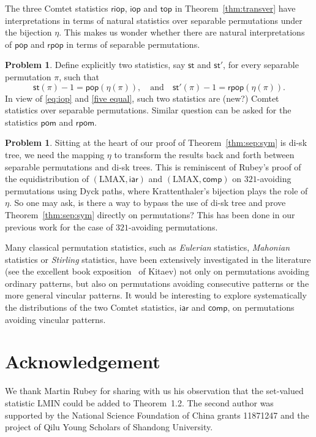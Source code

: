 \documentclass[12pt]{amsart}
\numberwithin{equation}{section}
\theoremstyle{plain}
\theoremstyle{definition}
\newtheorem{?}[theorem]{Problem}
\def\iar{\mathsf{iar}}
\def\comp{\mathsf{comp}}
\def\LMAX{\mathrm{LMAX}}
\def\LMIN{\mathrm{LMIN}}
\def\LMIN{\mathrm{LMIN}}
\def\st{\mathsf{st}}
\def\iop{\mathsf{iop}}
\def\top{\mathsf{top}}
\def\riop{\mathsf{riop}}
\def\pop{\mathsf{pop}}
\def\rpop{\mathsf{rpop}}
\def\pom{\mathsf{pom}}
\def\rpom{\mathsf{rpom}}
\begin{document}
The three Comtet statistics $\riop$, $\iop$ and $\top$ in Theorem~\ref{thm:transver} have  interpretations in terms of natural statistics over separable permutations under the bijection $\eta$. This makes us wonder whether there are natural interpretations of $\pop$ and $\rpop$ in terms of separable permutations. 
\begin{?}
Define explicitly two statistics, say $\st$ and $\st'$, for every separable permutation $\pi$, such that
$$\st(\pi)-1 = \pop(\eta(\pi)),\quad \text{and} \quad \st'(\pi)-1 = \rpop(\eta(\pi)).$$
In view of \eqref{eq:iop} and \eqref{five equal}, such two statistics are (new?) Comtet statistics over separable permutations. Similar question can be asked for the statistics $\pom$ and $\rpom$.
\end{?}
\begin{?}
Sitting at the heart of our proof of Theorem~\ref{thm:sep:sym} is di-sk tree, we need the mapping $\eta$ to transform the results back and forth between separable permutations and di-sk trees. This is reminiscent of Rubey's proof \cite{rub} of the equidistribution of $(\LMAX,\iar)$ and $(\LMAX,\comp)$ on $321$-avoiding permutations using Dyck paths, where Krattenthaler's bijection plays the role of $\eta$. So one may ask, is there a way to bypass the use of di-sk tree and prove Theorem~\ref{thm:sep:sym} directly on permutations? This has been done in our previous work \cite{flw} for the case of $321$-avoiding permutations.
\end{?}


Many classical permutation statistics, such as {\em Eulerian} statistics, {\em Mahonian} statistics or {\em Stirling} statistics, have been extensively investigated in the literature (see the excellent book exposition~\cite{kit} of Kitaev) not only on permutations avoiding ordinary  patterns, but also on permutations avoiding consecutive patterns or the more general vincular patterns. It would be interesting to explore systematically the distributions of the two Comtet statistics, $\iar$ and $\comp$, on permutations avoiding vincular patterns.




\section*{Acknowledgement}

We thank Martin Rubey for sharing with us his observation that  the set-valued statistic $\LMIN$ could be added to Theorem~1.2.
The second author was supported
by the National Science Foundation of China grants 11871247 and the project of Qilu Young Scholars of Shandong University.
\end{document}
